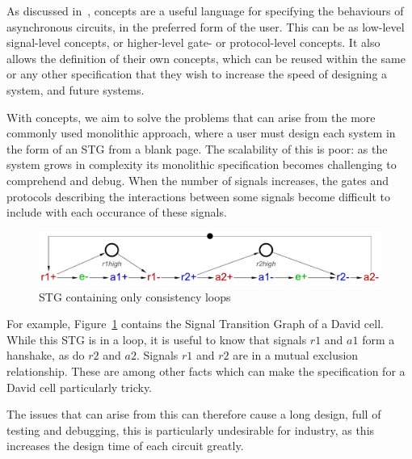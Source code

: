 \documentclass[british,conference,compsoc]{IEEEtran}
\begin{document}
As discussed in~\cite{2015_Beaumont_MEMOCODE}, concepts are a useful language 
for specifying the behaviours of asynchronous circuits, in the preferred form 
of the user. This can be as low-level signal-level concepts, or higher-level 
gate- or protocol-level concepts. It also allows the definition of their own 
concepts, which can be reused within the same or any other specification that 
they wish to increase the speed of designing a system, and future systems. 

With concepts, we aim to solve the problems that can arise from the more 
commonly used monolithic approach, where a user must design each system in the 
form of an STG from a blank page. The scalability of this is poor: as the 
system grows in complexity its monolithic specification becomes challenging to 
comprehend and debug. When the number of signals increases, the gates and 
protocols describing the interactions between some signals become difficult to
include with each occurance of these signals. 

\begin{figure}[h]
\vspace{-3mm}
\begin{centering}
\includegraphics[scale=0.25]{Images/DC-stg.pdf}
\par\end{centering}
\protect\caption{\label{fig:DC-stg} STG containing only consistency loops}
\vspace{-6mm}
\end{figure}

For example, Figure~\ref{fig:DC-stg} contains the Signal Transition Graph of a
David cell. While this STG is in a loop, it is useful to know that signals $r1$ 
and $a1$ form a hanshake, as do $r2$ and $a2$. Signals $r1$ and $r2$ are in a
mutual exclusion relationship. These are among other facts which can make
the specification for a David cell particularly tricky. 


The issues that can arise from this can therefore cause a long design, full of 
testing and debugging, this is particularly undesirable for industry, as 
this increases the design time of each circuit greatly. 
\end{document}
